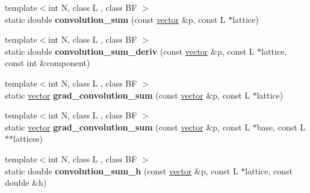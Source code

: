 \begin{DoxyCompactItemize}
\item 
\mbox{\label{classsisl_1_1tp__cubic__imom_ac846d3615a779cc2d2f3201f4bc12c9a}} 
{\footnotesize template$<$int N, class L , class BF $>$ }\\static double {\bfseries convolution\+\_\+sum} (const \hyperlink{namespacesisl_a2069bd5374a9be042ff3ce3306d41e1a}{vector} \&p, const L $\ast$lattice)
\item 
\mbox{\label{classsisl_1_1tp__cubic__imom_af465e487917108dc0a1a4f76118abc36}} 
{\footnotesize template$<$int N, class L , class BF $>$ }\\static double {\bfseries convolution\+\_\+sum\+\_\+deriv} (const \hyperlink{namespacesisl_a2069bd5374a9be042ff3ce3306d41e1a}{vector} \&p, const L $\ast$lattice, const int \&component)
\item 
\mbox{\label{classsisl_1_1tp__cubic__imom_a958e6a310da8fae4a25b59d443594b3a}} 
{\footnotesize template$<$int N, class L , class BF $>$ }\\static \hyperlink{namespacesisl_a2069bd5374a9be042ff3ce3306d41e1a}{vector} {\bfseries grad\+\_\+convolution\+\_\+sum} (const \hyperlink{namespacesisl_a2069bd5374a9be042ff3ce3306d41e1a}{vector} \&p, const L $\ast$lattice)
\item 
\mbox{\label{classsisl_1_1tp__cubic__imom_a90b70c9920402c1c021b89518318e250}} 
{\footnotesize template$<$int N, class L , class BF $>$ }\\static \hyperlink{namespacesisl_a2069bd5374a9be042ff3ce3306d41e1a}{vector} {\bfseries grad\+\_\+convolution\+\_\+sum} (const \hyperlink{namespacesisl_a2069bd5374a9be042ff3ce3306d41e1a}{vector} \&p, const L $\ast$base, const L $\ast$$\ast$lattices)
\item 
\mbox{\label{classsisl_1_1tp__cubic__imom_a216ad095abfc41041a09154e77f0a763}} 
{\footnotesize template$<$int N, class L , class BF $>$ }\\static double {\bfseries convolution\+\_\+sum\+\_\+h} (const \hyperlink{namespacesisl_a2069bd5374a9be042ff3ce3306d41e1a}{vector} \&p, const L $\ast$lattice, const double \&h)
\item 
\mbox{\label{classsisl_1_1tp__cubic__imom_a8868ac71fd2df7e1d20c923118d2fe74}} 
$$
\end{DoxyCompactItemize}
